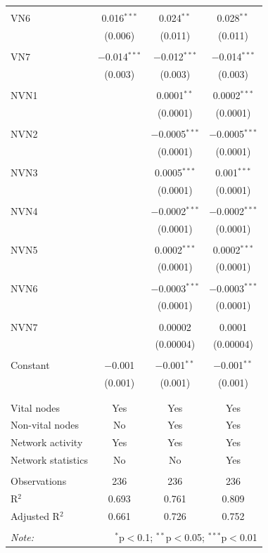\begin{table}[!htbp]
\begin{tabular}{@{\extracolsep{5pt}}lccc}
  & & & \\ 
 VN6 & 0.016$^{***}$ & 0.024$^{**}$ & 0.028$^{**}$ \\ 
  & (0.006) & (0.011) & (0.011) \\ 
  & & & \\ 
 VN7 & $-$0.014$^{***}$ & $-$0.012$^{***}$ & $-$0.014$^{***}$ \\ 
  & (0.003) & (0.003) & (0.003) \\ 
  & & & \\ 
 NVN1 &  & 0.0001$^{**}$ & 0.0002$^{***}$ \\ 
  &  & (0.0001) & (0.0001) \\ 
  & & & \\ 
 NVN2 &  & $-$0.0005$^{***}$ & $-$0.0005$^{***}$ \\ 
  &  & (0.0001) & (0.0001) \\ 
  & & & \\ 
 NVN3 &  & 0.0005$^{***}$ & 0.001$^{***}$ \\ 
  &  & (0.0001) & (0.0001) \\ 
  & & & \\ 
 NVN4 &  & $-$0.0002$^{***}$ & $-$0.0002$^{***}$ \\ 
  &  & (0.0001) & (0.0001) \\ 
  & & & \\ 
 NVN5 &  & 0.0002$^{***}$ & 0.0002$^{***}$ \\ 
  &  & (0.0001) & (0.0001) \\ 
  & & & \\ 
 NVN6 &  & $-$0.0003$^{***}$ & $-$0.0003$^{***}$ \\ 
  &  & (0.0001) & (0.0001) \\ 
  & & & \\ 
 NVN7 &  & 0.00002 & 0.0001 \\ 
  &  & (0.00004) & (0.00004) \\ 
  & & & \\ 
 Constant & $-$0.001 & $-$0.001$^{**}$ & $-$0.001$^{**}$ \\ 
  & (0.001) & (0.001) & (0.001) \\ 
  & & & \\ 
\hline \\[-1.8ex] 
Vital nodes & Yes & Yes & Yes \\ 
Non-vital nodes & No & Yes & Yes \\ 
Network activity & Yes & Yes & Yes \\ 
Network statistics & No & No & Yes \\ 
\hline &  &  &  \\ 
Observations & 236 & 236 & 236 \\ 
R$^{2}$ & 0.693 & 0.761 & 0.809 \\ 
Adjusted R$^{2}$ & 0.661 & 0.726 & 0.752 \\ 
\hline 
\hline \\[-1.8ex] 
\textit{Note:}  & \multicolumn{3}{r}{$^{*}$p$<$0.1; $^{**}$p$<$0.05; $^{***}$p$<$0.01} \\ 
\end{tabular} 
\end{table} 
